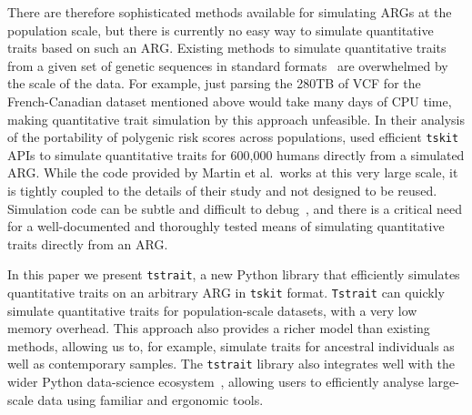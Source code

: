 \documentclass[unnumsec,webpdf,modern,large,namedate]{oup-authoring-template}%
\begin{document}
There are therefore sophisticated methods available for simulating
ARGs at the population scale, but there is currently no
easy way to simulate quantitative traits based on such an ARG.
Existing methods to simulate quantitative traits from a given set of
genetic sequences in standard formats~\citep[e.g.][]{meyer2018,fernandes2020}
are overwhelmed by the scale of the data. For example,
just parsing the 280TB of VCF for the French-Canadian
dataset mentioned above would take many days of CPU time,
making quantitative trait simulation by this approach unfeasible.
In their analysis of the portability of polygenic risk
scores across populations, \citet{martin2017}
used efficient \texttt{tskit} APIs to simulate quantitative
traits for 600,000 humans directly from a simulated ARG.
While the code provided by Martin et al.\ works at this
very large scale, it is tightly coupled to the details of their study
and not designed to be reused.
Simulation code can be subtle and difficult to
debug~\citep{ragsdale2020lessons}, and there
is a critical need for a well-documented and
thoroughly tested means of simulating quantitative
traits directly from an ARG.

In this paper we present \texttt{tstrait}, a new Python library that
efficiently simulates quantitative traits on an arbitrary ARG
in \texttt{tskit} format.
\texttt{Tstrait} can
quickly simulate quantitative traits for population-scale datasets,
with a very low memory overhead. This approach also provides a
richer model than existing methods,
allowing us to, for example, simulate traits for
ancestral individuals as well as contemporary samples.
The \texttt{tstrait} library also integrates well with the wider
Python data-science ecosystem~\citep{numpy}, 
allowing users to efficiently analyse
large-scale data using familiar and ergonomic tools.
\end{document}

